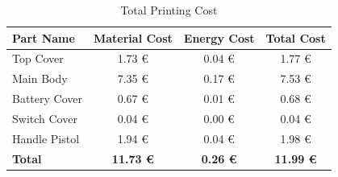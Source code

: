 \begin{table}[!ht]
    \centering
    \begin{tabular}{|l|c|c|c|}
        \hline
        \textbf{Part Name} & \textbf{Material Cost} & \textbf{Energy Cost} & \textbf{Total Cost} \\ \hline
        Top Cover          & 1.73 €                 & 0.04 €               & 1.77 €              \\ \hline
        Main Body          & 7.35 €                 & 0.17 €               & 7.53 €              \\ \hline
        Battery Cover      & 0.67 €                 & 0.01 €               & 0.68 €              \\ \hline
        Switch Cover       & 0.04 €                 & 0.00 €               & 0.04 €              \\ \hline
        Handle Pistol      & 1.94 €                 & 0.04 €               & 1.98 €              \\ \hline
        \textbf{Total}     & \textbf{11.73 €}       & \textbf{0.26 €}      & \textbf{11.99 €}    \\ \hline
    \end{tabular}
    \caption{Total Printing Cost}
    \label{tab:totalprintingcost}
\end{table}

